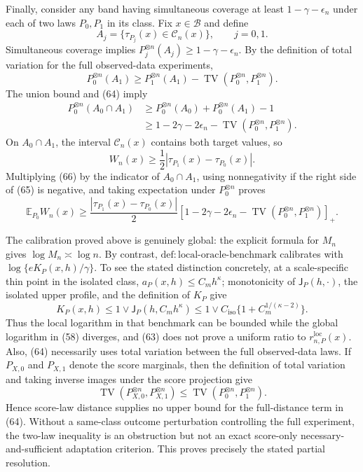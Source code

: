 Finally, consider any band having simultaneous coverage at least \(1-\gamma-\epsilon_n\) under each of two laws \(P_0,P_1\) in its class.  Fix \(x\in\mathcal B\) and define
\[
 A_j=\{\tau_{P_j}(x)\in\mathcal C_n(x)\},\qquad j=0,1.
\]
Simultaneous coverage implies \(P_j^{\otimes n}(A_j)\ge1-\gamma-\epsilon_n\).  By the definition of total variation for the full observed-data experiments,
\[
 P_0^{\otimes n}(A_1)
 \ge P_1^{\otimes n}(A_1)
 -\operatorname{TV}(P_0^{\otimes n},P_1^{\otimes n}). \tag{64}
\]
The union bound and (64) imply
\[
 \begin{aligned}
 P_0^{\otimes n}(A_0\cap A_1)
 &\ge P_0^{\otimes n}(A_0)+P_0^{\otimes n}(A_1)-1\\
 &\ge1-2\gamma-2\epsilon_n
 -\operatorname{TV}(P_0^{\otimes n},P_1^{\otimes n}).
 \end{aligned} \tag{65}
\]
On \(A_0\cap A_1\), the interval \(\mathcal C_n(x)\) contains both target values, so
\[
 W_n(x)\ge\frac12|\tau_{P_1}(x)-\tau_{P_0}(x)|. \tag{66}
\]
Multiplying (66) by the indicator of \(A_0\cap A_1\), using nonnegativity if the right side of (65) is negative, and taking expectation under \(P_0^{\otimes n}\) proves
\[
 \mathbb E_{P_0}W_n(x)
 \ge\frac{|\tau_{P_1}(x)-\tau_{P_0}(x)|}{2}
 \left[1-2\gamma-2\epsilon_n
 -\operatorname{TV}(P_0^{\otimes n},P_1^{\otimes n})\right]_+.
\]

The calibration proved above is genuinely global: the explicit formula for \(M_n\) gives \(\log M_n\asymp\log n\).  By contrast, \(\mathrm{def:local\text{-}oracle\text{-}benchmark}\) calibrates with \(\log\{eK_P(x,h)/\gamma\}\).  To see the stated distinction concretely, at a scale-specific thin point in the isolated class, \(a_P(x,h)\le C_mh^{\kappa}\); monotonicity of \(\mathsf J_P(h,\cdot)\), the isolated upper profile, and the definition of \(K_P\) give
\[
 K_P(x,h)
 \le 1\vee\mathsf J_P(h,C_mh^{\kappa})
 \le1\vee C_{\mathrm{iso}}\{1+C_m^{1/(\kappa-2)}\}. \tag{67}
\]
Thus the local logarithm in that benchmark can be bounded while the global logarithm in (58) diverges, and (63) does not prove a uniform ratio to \(r_{n,P}^{\mathrm{loc}}(x)\).  Also, (64) necessarily uses total variation between the full observed-data laws.  If \(P_{X,0}\) and \(P_{X,1}\) denote the score marginals, then the definition of total variation and taking inverse images under the score projection give
\[
 \operatorname{TV}(P_{X,0}^{\otimes n},P_{X,1}^{\otimes n})
 \le\operatorname{TV}(P_0^{\otimes n},P_1^{\otimes n}). \tag{68}
\]
Hence score-law distance supplies no upper bound for the full-distance term in (64).  Without a same-class outcome perturbation controlling the full experiment, the two-law inequality is an obstruction but not an exact score-only necessary-and-sufficient adaptation criterion.  This proves precisely the stated partial resolution.